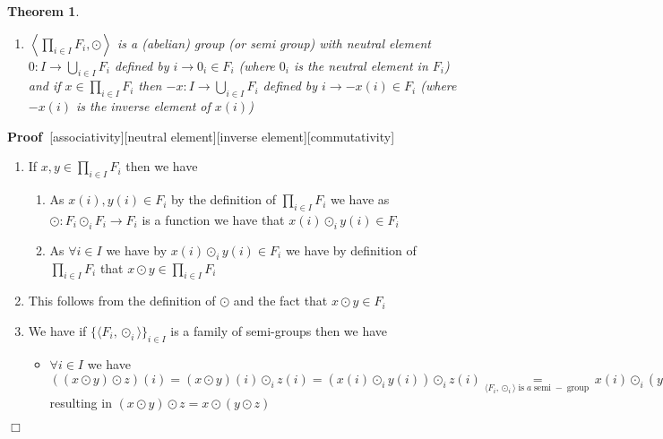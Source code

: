 \documentclass{book}
\newcommand{\equallim}{\mathop{=}\limits}
\newcommand{\tmop}[1]{\ensuremath{\operatorname{#1}}}
\newenvironment{itemizedot}{\begin{itemize} \renewcommand{\labelitemi}{$\bullet$}\renewcommand{\labelitemii}{$\bullet$}\renewcommand{\labelitemiii}{$\bullet$}\renewcommand{\labelitemiv}{$\bullet$}}{\end{itemize}}
\newenvironment{proof}{\noindent\textbf{Proof\ }}{\hspace*{\fill}$\Box$\medskip}
\newtheorem{theorem}{Theorem}
\begin{document}
{{\begin{theorem}
\begin{enumerate}
    \item $\left\langle \prod_{i \in I} F_i, \odot \right\rangle$ is a
    (abelian) group (or semi group) with neutral element $0 : I \rightarrow
    \bigcup_{i \in I} F_i$ defined by $i \rightarrow 0_i \in F_i$ (where $0_i$
    is the neutral element in $F_i$) and if $x \in \prod_{i \in I} F_i$ then
    $- x : I \rightarrow \bigcup_{i \in I} F_i$ defined by $i \rightarrow - x
    (i) \in F_i$ (where $- x (i)$ is the inverse element of $x (i)$)
  \end{enumerate}
\end{theorem}

\begin{proof}[associativity][neutral element][inverse element][commutativity]
  
  \begin{enumerate}
    \item If $x, y \in \prod_{i \in I} F_i$ then we have
    \begin{enumerate}
      \item As $x (i), y (i) \in F_i$ by the definition of $\prod_{i \in I}
      F_i$ we have as $\odot : F_i \odot_i F_i \rightarrow F_i$ is a function
      we have that $x (i) \odot_i y (i) \in F_i$
      
      \item As $\forall i \in I$ we have by $x (i) \odot_i y (i) \in F_i$ we
      have by definition of $\prod_{i \in I} F_i$ that $x \odot y \in \prod_{i
      \in I} F_i$
    \end{enumerate}
    \item This follows from the definition of $\odot$ and the fact that $x
    \odot y \in F_i$
    
    \item We have if $\{ \langle F_i, \odot_i \rangle \}_{i \in I}$ is a
    family of semi-groups then we have
    \begin{itemizedot}
      \item $\forall i \in I$ we have $((x \odot y) \odot z) (i) = (x \odot y)
      (i) \odot_i z (i) = (x (i) \odot_i y (i)) \odot_i z (i)
      \equallim_{\langle F_i, \odot_i \rangle \tmop{is} a \tmop{semi} -
      \tmop{group}} x (i) \odot_i (y (i) \odot_i z (i)) = x (i) \odot_i (y
      \odot z) (i) = (x \odot (y \odot z)) (i)$ resulting in $(x \odot y)
      \odot z = x \odot (y \odot z)$
      

\end{itemizedot}
\end{enumerate}
\end{proof}}}
\end{document}

